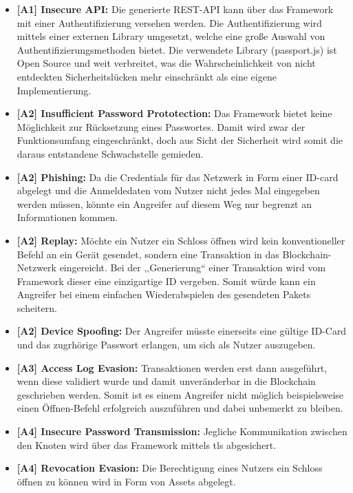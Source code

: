     \begin{itemize}[leftmargin=0cm,label={}]
        \item \textbf{[A1] Insecure API:} Die generierte REST-API kann über das Framework mit einer Authentifizierung versehen werden. 
        Die Authentifizierung wird mittels einer externen Library umgesetzt, welche eine große Auswahl von Authentifizierungsmethoden bietet. 
        Die verwendete Library (passport.js) ist Open Source und weit verbreitet, was die Wahrscheinlichkeit von nicht entdeckten Sicherheitslücken mehr einschränkt als eine eigene Implementierung. 
        \item \textbf{[A2] Insufficient Password Prototection:} Das Framework bietet keine Möglichkeit zur Rücksetzung eines Passwortes. 
        Damit wird zwar der Funktionsumfang eingeschränkt, doch aus Sicht der Sicherheit wird somit die daraus entstandene Schwachstelle gemieden.
        \item \textbf{[A2] Phishing:} Da die Credentials für das Netzwerk in Form einer ID-card abgelegt und die Anmeldedaten vom Nutzer nicht jedes Mal eingegeben werden müssen, könnte ein Angreifer auf diesem Weg nur begrenzt an Informationen kommen.
        \item \textbf{[A2] Replay:} Möchte ein Nutzer ein Schloss öffnen wird kein konventioneller Befehl an ein Gerät gesendet, sondern eine Transaktion in das Blockchain-Netzwerk eingereicht. 
        Bei der ,,Generierung`` einer Transaktion wird vom Framework dieser eine einzigartige ID vergeben. 
        Somit würde kann ein Angreifer bei einem einfachen Wiederabspielen des gesendeten Pakets scheitern. 
        \item \textbf{[A2] Device Spoofing:} Der Angreifer müsste einerseits eine gültige ID-Card und das zugrhörige Passwort erlangen, um sich als Nutzer auszugeben.
        \item \textbf{[A3] Access Log Evasion:} Transaktionen werden erst dann ausgeführt, wenn diese validiert wurde und damit unveränderbar in die Blockchain geschrieben werden. 
        Somit ist es einem Angreifer nicht möglich beispielsweise einen Öffnen-Befehl erfolgreich auszuführen und dabei unbemerkt zu bleiben.
        \newpage
        \item \textbf{[A4] Insecure Password Transmission:} Jegliche Kommunikation zwischen den Knoten wird über das Framework mittels \gls{tls} abgesichert.
        \item \textbf{[A4] Revocation Evasion:} Die Berechtigung eines Nutzers ein Schloss öffnen zu können wird in Form von Assets abgelegt. 

\end{itemize}
